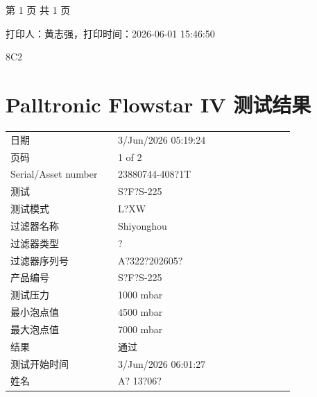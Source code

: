\documentclass[UTF8,10pt,a4paper,fontset=fandol]{ctexart}
\newcommand{\fieldvalue}[1]{#1}
\newcommand{\handwritten}[1]{#1}
\begin{document}
\vfill

\begin{center}
第 1 页 共 1 页

\vspace{0.4em}
打印人：黄志强，打印时间：2026-06-01 15:46:50
\end{center}

\handwritten{8C2}

\newpage

\section*{Palltronic Flowstar IV 测试结果}

\begin{tabular}{@{}p{0.34\linewidth}p{0.56\linewidth}@{}}
日期 &
\fieldvalue{3/Jun/2026 05:19:24}
\\[2pt]
页码 &
\fieldvalue{1 of 2}
\\[2pt]
Serial/Asset number &
\fieldvalue{23880744-408?1T}
\\[2pt]
测试 &
\fieldvalue{S?F?S-225}
\\[2pt]
测试模式 &
\fieldvalue{L?XW}
\\[2pt]
过滤器名称 &
\fieldvalue{Shiyonghou}
\\[2pt]
过滤器类型 &
\fieldvalue{?}
\\[2pt]
过滤器序列号 &
\fieldvalue{A?322?202605?}
\\[2pt]
产品编号 &
\fieldvalue{S?F?S-225}
\\[2pt]
测试压力 &
\fieldvalue{1000 mbar}
\\[2pt]
最小泡点值 &
\fieldvalue{4500 mbar}
\\[2pt]
最大泡点值 &
\fieldvalue{7000 mbar}
\\[2pt]
结果 &
\fieldvalue{通过}
\\[2pt]
测试开始时间 &
\fieldvalue{3/Jun/2026 06:01:27}
\\[2pt]
姓名 &
\fieldvalue{\handwritten{A? 13?06?}}
\end{tabular}
\end{document}
